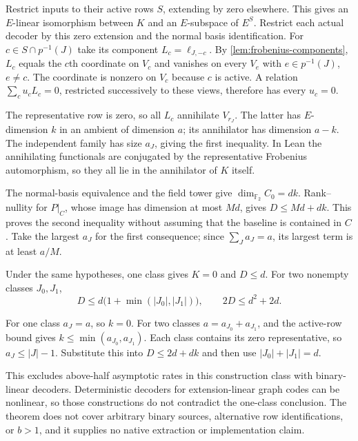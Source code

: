 \begin{outline}
Restrict inputs to their active rows $S$, extending by zero elsewhere.
This gives an $E$-linear isomorphism between $K$ and an $E$-subspace of
$E^S$. Restrict each actual decoder by this zero extension and the normal
basis identification. For $c\in S\cap p^{-1}(J)$ take its component
$L_c=\ell_{J,-c}$. By \cref{lem:frobenius-components}, $L_c$ equals the
$c$th coordinate on $V_c$ and vanishes on every $V_e$ with
$e\in p^{-1}(J)$, $e\ne c$. The coordinate is nonzero on $V_c$ because
$c$ is active. A relation $\sum_c u_cL_c=0$, restricted successively to
these views, therefore has every $u_c=0$.

The representative row is zero, so all $L_c$ annihilate $V_{r_J}$.
The latter has $E$-dimension $k$ in an ambient of dimension $a$; its
annihilator has dimension $a-k$. The independent family has size $a_J$,
giving the first inequality. In Lean the annihilating functionals are
conjugated by the representative Frobenius automorphism, so they all lie
in the annihilator of $K$ itself.

The normal-basis equivalence and the field tower give
$\dim_{\mathbb F_2}C_0=dk$. Rank--nullity for $P|_C$, whose image has
dimension at most $Md$, gives $D\le Md+dk$. This proves the second
inequality without assuming that the baseline is contained in $C$.
Take the largest $a_J$ for the first consequence; since
$\sum_J a_J=a$, its largest term is at least $a/M$.
\end{outline}

\begin{corollary}\label{cor:field-linear-half}
Under the same hypotheses, one class gives $K=0$ and $D\le d$.
For two nonempty classes $J_0,J_1$,
\[
 D\le d\bigl(1+\min(|J_0|,|J_1|)\bigr),\qquad
 2D\le d^2+2d.
\]
\end{corollary}

\begin{outline}
For one class $a_J=a$, so $k=0$. For two classes
$a=a_{J_0}+a_{J_1}$, and the active-row bound gives
$k\le\min(a_{J_0},a_{J_1})$. Each class contains its zero representative,
so $a_J\le |J|-1$. Substitute this into $D\le2d+dk$ and then use
$|J_0|+|J_1|=d$.
\end{outline}

This excludes above-half asymptotic rates in this construction class with
binary-linear decoders. Deterministic decoders for extension-linear graph
codes can be nonlinear, so those constructions do not contradict the
one-class conclusion. The theorem does not cover arbitrary binary sources,
alternative row identifications, or $b>1$, and it supplies no native
extraction or implementation claim.
